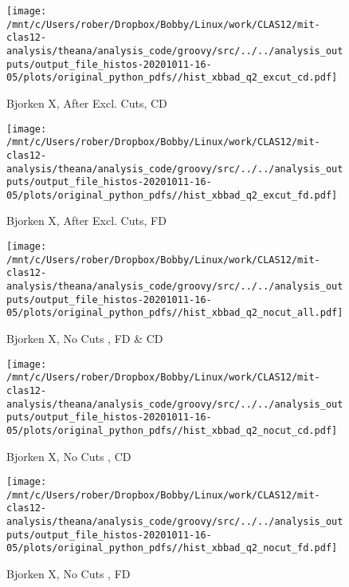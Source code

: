 \documentclass{article}
\begin{document}
\begin{landscape}
    \begin{figure}[h]
        \centering

        \texttt{[image: /mnt/c/Users/rober/Dropbox/Bobby/Linux/work/CLAS12/mit-clas12-analysis/theana/analysis\_code/groovy/src/../../analysis\_outputs/output\_file\_histos-20201011-16-05/plots/original\_python\_pdfs//hist\_xbbad\_q2\_excut\_cd.pdf]}
        \captionsetup{textformat=empty,labelformat=blank}
        \caption{Bjorken X, After Excl. Cuts, CD}
    \end{figure}
    \clearpage
    
    \begin{figure}[h]
        \centering

        \texttt{[image: /mnt/c/Users/rober/Dropbox/Bobby/Linux/work/CLAS12/mit-clas12-analysis/theana/analysis\_code/groovy/src/../../analysis\_outputs/output\_file\_histos-20201011-16-05/plots/original\_python\_pdfs//hist\_xbbad\_q2\_excut\_fd.pdf]}
        \captionsetup{textformat=empty,labelformat=blank}
        \caption{Bjorken X, After Excl. Cuts, FD}
    \end{figure}
    \clearpage
    
    \begin{figure}[h]
        \centering

        \texttt{[image: /mnt/c/Users/rober/Dropbox/Bobby/Linux/work/CLAS12/mit-clas12-analysis/theana/analysis\_code/groovy/src/../../analysis\_outputs/output\_file\_histos-20201011-16-05/plots/original\_python\_pdfs//hist\_xbbad\_q2\_nocut\_all.pdf]}
        \captionsetup{textformat=empty,labelformat=blank}
        \caption{Bjorken X, No Cuts , FD \& CD}
    \end{figure}
    \clearpage
    
    \begin{figure}[h]
        \centering

        \texttt{[image: /mnt/c/Users/rober/Dropbox/Bobby/Linux/work/CLAS12/mit-clas12-analysis/theana/analysis\_code/groovy/src/../../analysis\_outputs/output\_file\_histos-20201011-16-05/plots/original\_python\_pdfs//hist\_xbbad\_q2\_nocut\_cd.pdf]}
        \captionsetup{textformat=empty,labelformat=blank}
        \caption{Bjorken X, No Cuts , CD}
    \end{figure}
    \clearpage
    
    \begin{figure}[h]
        \centering

        \texttt{[image: /mnt/c/Users/rober/Dropbox/Bobby/Linux/work/CLAS12/mit-clas12-analysis/theana/analysis\_code/groovy/src/../../analysis\_outputs/output\_file\_histos-20201011-16-05/plots/original\_python\_pdfs//hist\_xbbad\_q2\_nocut\_fd.pdf]}
        \captionsetup{textformat=empty,labelformat=blank}
        \caption{Bjorken X, No Cuts , FD}
    \end{figure}
    \clearpage
    

\end{landscape}
\end{document}
